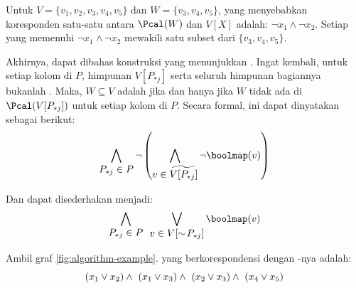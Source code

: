 \begin{example}
	Untuk \(V = \{v_1, v_2, v_3, v_4, v_5\}\) dan \(W = \{v_3, v_4, v_5\}\),  yang menyebabkan koresponden satu-satu antara \(\Pcal(W)\) dan \(V[X]\) adalah: \(\neg x_1 \wedge \neg x_2\). Setiap  yang memenuhi \(\neg x_1 \wedge \neg x_2\) mewakili satu subset dari \(\{v_3, v_4, v_5\}\).
\end{example}

Akhirnya, dapat dibahas konstruksi  yang menunjukkan . Ingat kembali, untuk setiap kolom di \(P\), himpunan \(V[P_{*j}]\) serta seluruh himpunan bagiannya bukanlah . Maka, \(W \subseteq V\) adalah  jika dan hanya jika \(W\) tidak ada di \(\Pcal(V[P_{*j}])\) untuk setiap kolom di \(P\). Secara formal, ini dapat dinyatakan sebagai berikut:
\[
	\bigwedge \limits_{\displaystyle P_{*j} \in P} \neg \left( \bigwedge \limits_{\displaystyle v \in \widetilde{V[P_{*j}]}} \neg \boolmap(v) \right)
\]

Dan dapat disederhakan menjadi:
\begin{equation}
	\bigwedge \limits_{\displaystyle P_{*j} \in P} \enspace \bigvee \limits_{\displaystyle v \in V[\sim\!P_{*j}]} \boolmap(v)
	\label{eq:boolean-satisfiability-natural}
\end{equation}

\begin{example}
	Ambil graf \autoref{fig:algorithm-example}.  yang berkorespondensi dengan -nya adalah:
		\[
			( x_1 \vee x_2 ) \wedge \ ( x_1 \vee x_3 ) \wedge \ ( x_2 \vee x_3 ) \wedge \ ( x_4 \vee x_5 )
			\vspace{-1.7em}
		\]
	\label{ex:boolean-satisfiability-natural}
\end{example}

